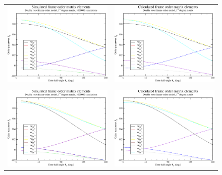 \begin{figure}
\centering
  \begin{tabular}{@{}cc@{}}
    \includegraphics[width=.5\textwidth]{images/frame_order_matrix/Sij_double_rotor_out_of_frame_theta_x_ens1000000.eps} &
    \includegraphics[width=.5\textwidth]{images/frame_order_matrix/Sij_double_rotor_out_of_frame_theta_x_calc.eps} \\
    \\[-5pt]
    \includegraphics[width=.5\textwidth]{images/frame_order_matrix/Sij_double_rotor_out_of_frame_theta_y_ens1000000.eps} &
    \includegraphics[width=.5\textwidth]{images/frame_order_matrix/Sij_double_rotor_out_of_frame_theta_y_calc.eps} \\

\end{tabular}
\end{figure}
